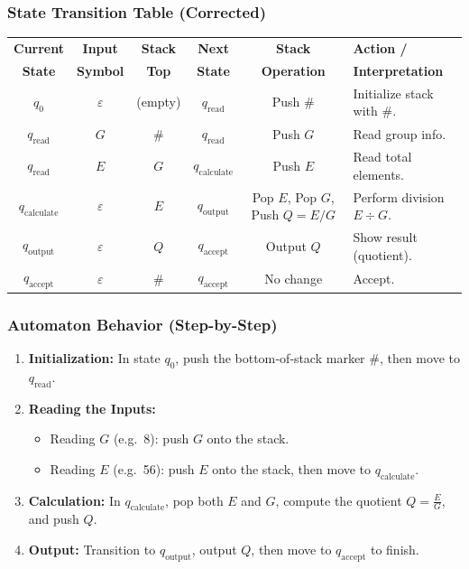 \documentclass[11pt]{article}
\begin{document}
\subsubsection*{State Transition Table (Corrected)}
\begin{center}
\renewcommand{\arraystretch}{1.3}
\begin{tabular}{|c|c|c|c|c|p{4.8cm}|}
\hline
\textbf{Current} & \textbf{Input} & \textbf{Stack} & \textbf{Next} & 
\textbf{Stack} & \textbf{Action /}\\
\textbf{State} & \textbf{Symbol} & \textbf{Top}   & \textbf{State} & 
\textbf{Operation} & \textbf{Interpretation}\\
\hline
\(q_{0}\) & \(\varepsilon\) & (empty) & \(q_{\text{read}}\) & Push \(\#\) & 
Initialize stack with \(\#\).\\
\hline
\(q_{\text{read}}\) & \(G\) & \(\#\) & \(q_{\text{read}}\) & Push \(G\) & 
Read group info.\\
\hline
\(q_{\text{read}}\) & \(E\) & \(G\) & \(q_{\text{calculate}}\) & Push \(E\) & 
Read total elements.\\
\hline
\(q_{\text{calculate}}\) & \(\varepsilon\) & \(E\) & \(q_{\text{output}}\) & 
Pop \(E\), Pop \(G\), Push \(Q=E/G\) & 
Perform division \(E \div G\).\\
\hline
\(q_{\text{output}}\) & \(\varepsilon\) & \(Q\) & \(q_{\text{accept}}\) & 
Output \(Q\) & Show result (quotient).\\
\hline
\(q_{\text{accept}}\) & \(\varepsilon\) & \(\#\) & \(q_{\text{accept}}\) & 
No change & Accept.\\
\hline
\end{tabular}
\end{center}

\subsubsection*{Automaton Behavior (Step-by-Step)}
\begin{enumerate}
  \item \textbf{Initialization:} In state \(q_{0}\), push the bottom‐of‐stack marker \(\#\), then move to \(q_{\text{read}}\).
  \item \textbf{Reading the Inputs:} 
    \begin{itemize}
      \item Reading \(G\) (e.g.\ 8): push \(G\) onto the stack.
      \item Reading \(E\) (e.g.\ 56): push \(E\) onto the stack, then move to \(q_{\text{calculate}}\).
    \end{itemize}
  \item \textbf{Calculation:} In \(q_{\text{calculate}}\), pop both \(E\) and \(G\), compute the quotient \(Q = \tfrac{E}{G}\), and push \(Q\). 
  \item \textbf{Output:} Transition to \(q_{\text{output}}\), output \(Q\), then move to \(q_{\text{accept}}\) to finish.
\end{enumerate}
\end{document}
